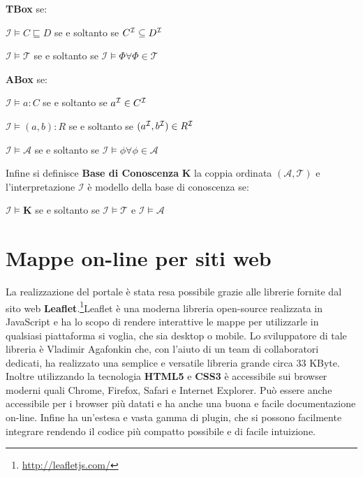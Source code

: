 \documentclass[a4paper,11pt]{article}
\newcommand{\I}{%
        \ensuremath{\mathcal{I}}\xspace}
\newcommand{\T}{%
  \ensuremath{\mathcal{T}}\xspace}
\newcommand{\A}{%
  \ensuremath{\mathcal{A}}\xspace}
\newcommand{\K}%
        {\ensuremath{\mathbf{K}}\xspace}
\begin{document}
\textbf{TBox} se:
\begin{center}
	$\I \models C \sqsubseteq D$ se e soltanto se $C^{\I} \subseteq D^{\I}$	
\end{center}
\begin{center}
	$\I \models \T$ se e soltanto se $\I \models \Phi \forall \Phi \in \T $
\end{center}
\textbf{ABox} se: 
\begin{center}
	$\I \models a:C$ se e soltanto se $ a^{\I} \in C^{\I}$
\end{center} 
\begin{center}
	$\I \models (a,b):R$ se e soltanto se $ (a^{\I},b^{\I}) \in R^{\I}$
\end{center}
\begin{center}
	$\I \models \A$ se e soltanto se $\I \models \phi \forall \phi \in \A $
\end{center}
Infine si definisce \textbf{Base di Conoscenza} $\K$ la coppia ordinata $(\A,\T) $ e l'interpretazione $\I$ è modello della base di conoscenza se:
\begin{center}
	$\I \models \K$ se e soltanto se $\I \models \T$ e $\I \models \A $
\end{center}

\newpage

\section{Mappe on-line per siti web}
\label{sec:3}
La realizzazione del portale è stata resa possibile grazie alle librerie fornite dal sito web \textbf{Leaflet}.\footnote{\url{http://leafletjs.com/}}\newline Leaflet è una moderna libreria open-source realizzata in JavaScript e ha lo scopo di rendere interattive le mappe per utilizzarle in qualsiasi piattaforma si voglia, che sia desktop o mobile. Lo sviluppatore di tale libreria è Vladimir Agafonkin che, con l'aiuto di un team di collaboratori dedicati, ha realizzato una semplice e versatile libreria grande circa 33 KByte. Inoltre utilizzando la tecnologia \textbf{HTML5} e \textbf{CSS3} è accessibile sui browser moderni quali Chrome, Firefox, Safari e Internet Explorer. Può essere anche accessibile per i browser più datati e ha anche una buona e facile documentazione on-line. Infine ha un'estesa e vasta gamma di plugin, che si possono facilmente integrare rendendo il codice più compatto possibile e di facile intuizione.
\end{document}
